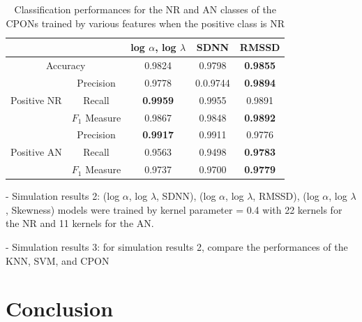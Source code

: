 \documentclass[times,twocolumn,final,authoryear]{elsarticle}
\begin{document}
\begin{table}[!t]
\caption{Classification performances for the NR and AN classes of the CPONs trained by various features when the positive class is NR} \label{Table_sim2}
\begin{center}
\begin{tabular}{|c|c|c|c|c|}\hline\hline
\multicolumn{2}{|c|}{}& log $\alpha$, log $\lambda$     & SDNN   & RMSSD  \\ \hline\hline
\multicolumn{2}{|c|}{Accuracy}         
& 0.9824  & 0.9798  & {\bf 0.9855} \\ \hline
\multirow{3}{*}{Positive NR} &  Precision 
& 0.9778  & 0.0.9744  & {\bf 0.9894}  \\ \cline{2-5}
& Recall   
& {\bf 0.9959}  & 0.9955 & 0.9891 \\ \cline{2-5}
& $F_1$ Measure 
& 0.9867  & 0.9848 & {\bf 0.9892} \\ \hline
\multirow{3}{*}{Positive AN} &  Precision  
& {\bf 0.9917}  & 0.9911  & 0.9776 \\ \cline{2-5}
& Recall   
& 0.9563  & 0.9498 & {\bf 0.9783} \\ \cline{2-5}
& $F_1$ Measure 
& 0.9737  &  0.9700 & {\bf 0.9779} \\ \hline
\end{tabular}
\end{center}
\end{table}
- Simulation results 2: (log $\alpha$, log $\lambda$, SDNN), (log $\alpha$, log $\lambda$, RMSSD), (log $\alpha$, log $\lambda$, Skewness)
 models were trained by kernel parameter = 0.4 with 22 kernels for the NR and 11 kernels for the AN.
 




- Simulation results 3: for simulation results 2, compare the performances of the KNN, SVM, and CPON




\section{Conclusion}
\end{document}
